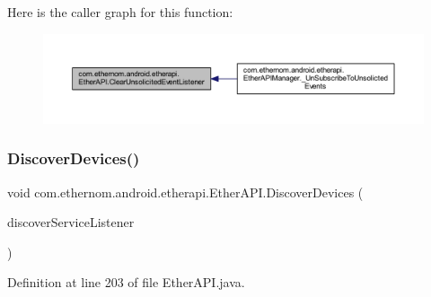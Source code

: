 Here is the caller graph for this function\+:\nopagebreak
\begin{figure}[H]
\begin{center}
\leavevmode
\includegraphics[width=350pt]{classcom_1_1ethernom_1_1android_1_1etherapi_1_1_ether_a_p_i_a5333200b5c0642e16df1fa76148d158c_icgraph}
\end{center}
\end{figure}
\mbox{\label{classcom_1_1ethernom_1_1android_1_1etherapi_1_1_ether_a_p_i_af98bcd73ca505716754cfe967a1b65fd}} 
\subsubsection{\texorpdfstring{Discover\+Devices()}{DiscoverDevices()}}
{\footnotesize\ttfamily void com.\+ethernom.\+android.\+etherapi.\+Ether\+A\+P\+I.\+Discover\+Devices (\begin{DoxyParamCaption}\item[{final \mbox{\hyperlink{interfacecom_1_1ethernom_1_1android_1_1etherapi_1_1_discover_service_listener}{Discover\+Service\+Listener}}}]{discover\+Service\+Listener }\end{DoxyParamCaption})}



Definition at line 203 of file Ether\+A\+P\+I.\+java.

